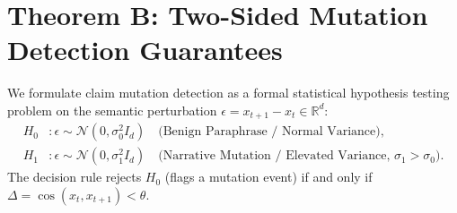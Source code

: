 \section{Theorem B: Two-Sided Mutation Detection Guarantees}
\label{sec:thmB}

We formulate claim mutation detection as a formal statistical hypothesis testing problem on the semantic perturbation $\epsilon = x_{t+1} - x_t \in \mathbb{R}^d$:
\begin{align}
\label{eq:hypothesis_testing}
H_0 &: \epsilon \sim \mathcal{N}(0, \sigma_0^2 I_d) \quad \text{(Benign Paraphrase / Normal Variance)}, \nonumber \\
H_1 &: \epsilon \sim \mathcal{N}(0, \sigma_1^2 I_d) \quad \text{(Narrative Mutation / Elevated Variance, } \sigma_1 > \sigma_0 \text{)}.
\end{align}
The decision rule rejects $H_0$ (flags a mutation event) if and only if $\Delta = \cos(x_t, x_{t+1}) < \theta$.

